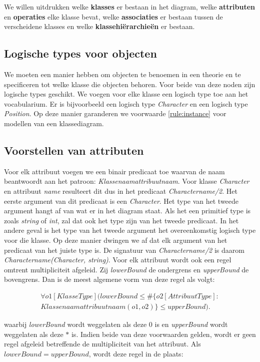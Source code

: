 We willen uitdrukken welke \textbf{klasses} er bestaan in het diagram, welke \textbf{attributen} en \textbf{operaties} elke klasse bevat, welke \textbf{associaties} er bestaan tussen de verscheidene klasses en welke \textbf{klassehi\"erarchie\"en} er bestaan.

\subsection{Logische types voor objecten}
We moeten een manier hebben om objecten te benoemen in een theorie en te specificeren tot welke klasse die objecten behoren. Voor beide van deze noden zijn logische types geschikt. We voegen voor elke klasse een logisch type toe aan het vocabularium. Er is bijvoorbeeld een logisch type \textit{Character} en een logisch type \textit{Position}. Op deze manier garanderen we voorwaarde \ref{rule:instance} voor modellen van een klassediagram.

\subsection{Voorstellen van attributen}
Voor elk attribuut voegen we een binair predicaat toe waarvan de naam beantwoordt aan het patroon: \textit{Klassenaamattribuutnaam}. Voor klasse \textit{Character} en attribuut \textit{name} resulteert dit dus in het predicaat \textit{Charactername/2}. Het eerste argument van dit predicaat is een \textit{Character}. Het type van het tweede argument hangt af van wat er in het diagram staat. Als het een primitief type is zoals \textit{string} of \textit{int}, zal dat ook het type zijn van het tweede predicaat. In het andere geval is het type van het tweede argument het overeenkomstig logisch type voor die klasse. Op deze manier dwingen we af dat elk argument van het predicaat van het juiste type is.
De signatuur van \textit{Charactername/2} is daarom \textit{Charactername(Character, string)}.
Voor elk attribuut wordt ook een regel omtrent multipliciteit afgeleid. Zij \textit{lowerBound} de ondergrens en \textit{upperBound} de bovengrens. Dan is de meest algemene vorm van deze regel als volgt:
	
\begin{align*}
	\forall{o1}[KlasseType](lowerBound \leq \#\{o2 [AttribuutType] : \\ Klassenaamattribuutnaam(o1,o2)\} \leq upperBound).
\end{align*}
	
waarbij \textit{lowerBound} wordt weggelaten als deze $0$ is en \textit{upperBound} wordt weggelaten als deze $*$ is. Indien beide van deze voorwaarden gelden, wordt er geen regel afgeleid betreffende de multipliciteit van het attribuut. Als $lowerBound = upperBound$, wordt deze regel in de plaats:
	
